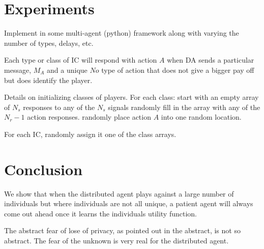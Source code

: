 \documentclass{article}
\begin{document}
\section{Experiments}

Implement in some multi-agent (python) framework along with varying
the number of types, delays, etc.

Each type or class of IC will respond with action $A$ when DA sends a
particular message, $M_A$ and a unique $No$ type of action that does
not give a bigger pay off but does identify the player.

Details on initializing classes of players.
For each class:
      start with an empty array of $N_s$ responses to any of the $N_s$ signals
      randomly fill in the array with any of the $N_r-1$  action responses.
      randomly place action $A$ into one random location.

For each IC, randomly assign it one of the class arrays.


\section{Conclusion}

We show that when the distributed agent plays against a large number
of individuals but where individuals are not all unique,  a patient
agent will always come out ahead once it learns the individuals
utility function.   

The abstract fear of lose of privacy, as pointed out in the abstract,
is not so abstract.  The fear of the unknown is very real for the
distributed agent.
\end{document}
